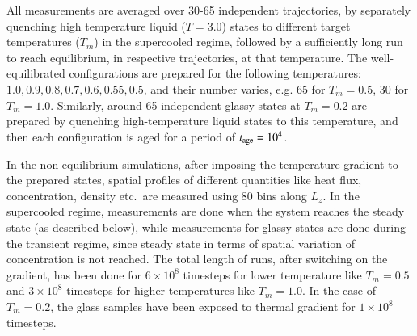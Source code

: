 All measurements are averaged over 30-65 independent trajectories, by separately quenching high temperature liquid ($T=3.0$) states to different target temperatures ($T_m$) in the supercooled regime, followed by a sufficiently long run to reach equilibrium, in respective trajectories, at that temperature. The well-equilibrated configurations are prepared for the following temperatures: $1.0, 0.9, 0.8, 0.7, 0.6, 0.55, 0.5$, and their number varies, e.g. $65$ for $T_m = 0.5$, $30$ for $T_m = 1.0$.  Similarly, around 65 independent glassy states at $T_m=0.2$ are prepared by quenching high-temperature liquid states to this temperature, and then each configuration is aged for a period of $t_{\rm age} = 10^4$.

In the non-equilibrium simulations, after imposing the temperature gradient to the prepared states, spatial profiles of different quantities like heat flux, concentration, density etc.~are  measured using 80 bins along $L_z$. In the supercooled regime, measurements are done when the system reaches the steady state (as described below), while measurements for glassy states are done during the transient regime, since steady state in terms of spatial variation of concentration is not reached. The total length of runs, after switching on the gradient, has been done for $6 \times 10^8$ timesteps for lower temperature like $T_m = 0.5$ and $3 \times 10^8$ timesteps for higher temperatures like $T_m = 1.0$. In the case of $T_m=0.2$, the glass samples have been exposed to thermal gradient for $1 \times 10^8$ timesteps.

